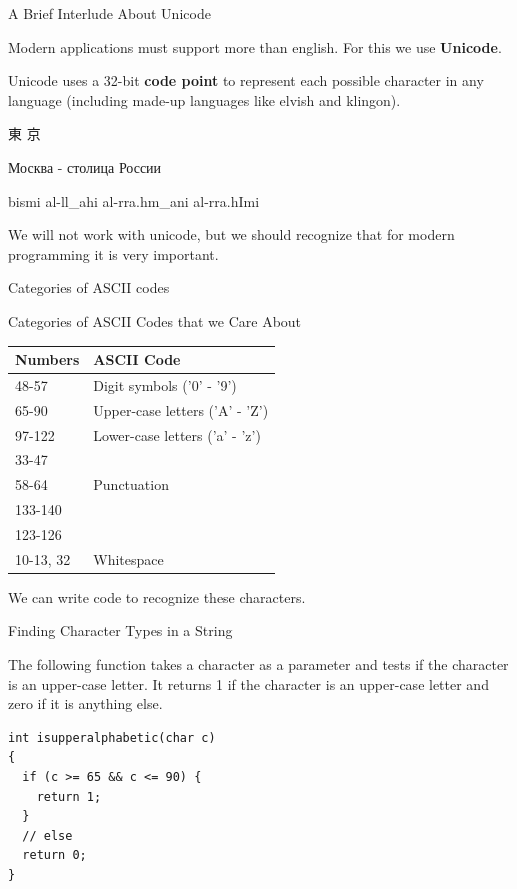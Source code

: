 \documentclass[10pt]{beamer}
\begin{document}
\begin{frame}[fragile]{A Brief Interlude About Unicode}

Modern applications must support more than english.  For this we use \textbf{Unicode}.

Unicode uses a 32-bit \textbf{code point} to represent each possible character in any language (including made-up languages like elvish and klingon).

\begin{CJK*}{UTF8}{bsmi}
東 京 
\end{CJK*}

Москва -  столица России

\begin{RLtext}
bismi al-ll_ahi al-rra.hm_ani al-rra.hImi
\end{RLtext}

We will not work with unicode, but we should recognize that for modern programming it is very important.
   
\end{frame}
\begin{frame}[fragile]{Categories of ASCII codes}

Categories of ASCII Codes that we Care About

\begin{tabular}{| l | l |}
\hline
Numbers & ASCII Code \\
\hline
\hline
48-57 & Digit symbols ('0' - '9') \\
\hline
65-90 & Upper-case letters ('A' - 'Z') \\
\hline
97-122 & Lower-case letters ('a' - 'z') \\
\hline
33-47 &    \\
58-64 & Punctuation \\
133-140 &  \\
123-126 &  \\
\hline
10-13, 32 & Whitespace \\
\hline
\end{tabular}

We can write code to recognize these characters.

\end{frame}
\begin{frame}[fragile]{Finding Character Types in a String}

The following function takes a character as a parameter and tests if the character is an upper-case letter.  It returns 1 if the character is an upper-case letter and zero if it is anything else.

\begin{verbatim}
int isupperalphabetic(char c)
{
  if (c >= 65 && c <= 90) {
    return 1;
  }
  // else
  return 0;
}
\end{verbatim}



\end{frame}
\end{document}
